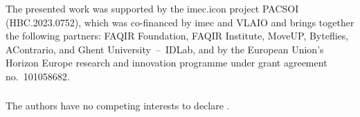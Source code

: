 \documentclass[runningheads]{llncs}
\begin{document}
\vspace{-2mm} %
\begin{credits}
	\subsubsection{\ackname}
		The presented work
	was supported by the imec.icon project PACSOI (HBC.2023.0752), which was co-financed by imec and VLAIO and brings together the following partners: FAQIR Foundation, FAQIR Institute, MoveUP, Byteflies, AContrario, and Ghent University~–~IDLab, and by the European Union's Horizon Europe research and innovation programme under grant agreement no.\ 101058682. %

\vspace{-3mm} %
	\subsubsection{\discintname}
	The authors have no competing interests to declare%
	.
\end{credits}




\clearpage

\end{document}
